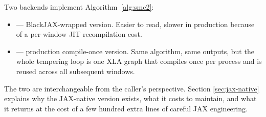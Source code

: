 Two backends implement Algorithm~\ref{alg:smc2}:
\begin{itemize}
  \item {} --- BlackJAX-wrapped
        version. Easier to read, slower in production because of a
        per-window JIT recompilation cost.
  \item {} --- production
        compile-once version. Same algorithm, same outputs, but the
        whole tempering loop is one XLA graph that compiles once per
        process and is reused across all subsequent windows.
\end{itemize}
The two are interchangeable from the caller's perspective. Section
\ref{sec:jax-native} explains why the JAX-native version exists, what
it costs to maintain, and what it returns at the cost of a few hundred
extra lines of careful JAX engineering.
